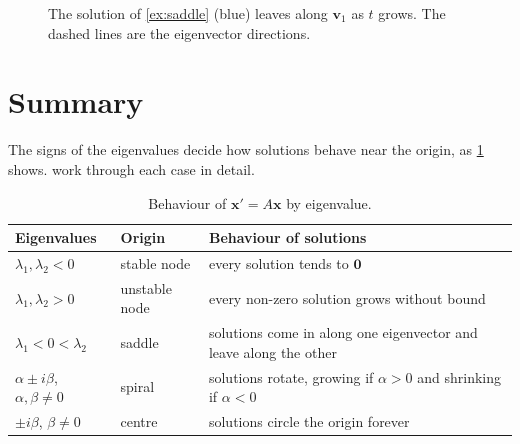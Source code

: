 \documentclass[11pt,a4paper]{article}   %
\numberwithin{equation}{section}
\numberwithin{figure}{section}
\numberwithin{table}{section}
\theoremstyle{plain}                    %
\theoremstyle{definition}               %
\theoremstyle{remark}                   %
\begin{document}
\begin{figure}[ht]
  \centering
  \caption{The solution of \cref{ex:saddle} (blue) leaves along $\mathbf{v}_1$ as $t$ grows.
    The dashed lines are the eigenvector directions.}
  \label{fig:phase}
\end{figure}

\section{Summary}

The signs of the eigenvalues decide how solutions behave near the origin, as
\cref{tab:cases} shows. \textcite{Boyce2017} work through each case in detail.

\begin{table}[ht]
  \centering
  \caption{Behaviour of $\mathbf{x}' = A\mathbf{x}$ by eigenvalue.}
  \label{tab:cases}
  \begin{tabularx}{0.85\textwidth}{l l X}
    \toprule
    Eigenvalues & Origin & Behaviour of solutions \\
    \midrule
    $\lambda_1, \lambda_2 < 0$ & stable node & every solution tends to $\mathbf{0}$ \\
    $\lambda_1, \lambda_2 > 0$ & unstable node & every non-zero solution grows without bound \\
    $\lambda_1 < 0 < \lambda_2$ & saddle & solutions come in along one eigenvector and leave along the other \\
    $\alpha \pm i\beta$, $\alpha, \beta \neq 0$ & spiral & solutions rotate, growing if $\alpha > 0$ and shrinking if $\alpha < 0$ \\
    $\pm i\beta$, $\beta \neq 0$ & centre & solutions circle the origin forever \\
    \bottomrule
  \end{tabularx}
\end{table}

\printbibliography
\end{document}
